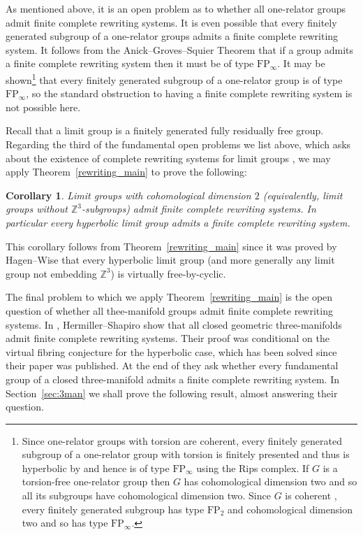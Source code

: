 \documentclass[12pt, a4paper]{amsart}
\newtheorem{corollary}[theorem]{Corollary}
\theoremstyle{definition}
\newcommand{\Z}{\mathbb{Z}}
\begin{document}
As mentioned above, it is an open problem as to whether all one-relator groups admit finite complete rewriting systems. It is even possible that every finitely generated subgroup of a one-relator groups admits a finite complete rewriting system. It follows from the Anick--Groves--Squier Theorem \cite{AGS} that if a group admits a finite complete rewriting system then it must be of type $\mathrm{FP}_\infty$. It may be shown\footnote{Since one-relator groups with torsion are coherent, every finitely generated subgroup of a one-relator group with torsion is finitely presented and thus is hyperbolic by \cite{Gersten} and hence is of type $\mathrm{FP}_\infty$ using the Rips complex. If $G$ is a torsion-free one-relator group then $G$ has cohomological dimension two and so all its subgroups have cohomological dimension two. Since $G$ is coherent \cite{JZL2025}, every finitely generated subgroup has type $\mathrm{FP}_2$ and cohomological dimension two and so has type $\mathrm{FP}_{\infty}$.} that every finitely generated subgroup of a one-relator group is of type $\mathrm{FP}_\infty$, so the standard obstruction to having a finite complete rewriting system is not possible here.  

Recall that a limit group is a finitely generated fully residually free group. Regarding the third of the fundamental open problems we list above, which asks about the existence of complete rewriting systems for limit groups \cite[Problem 2.7]{Diekert2010}, we may apply Theorem~\ref{rewriting_main} to prove the following:  

\begin{corollary}\label{theorem:LimitGroups}
Limit groups with cohomological dimension $2$   (equivalently, limit groups without $\Z^3$-subgroups) admit finite complete rewriting systems. In particular every  hyperbolic limit group admits a finite complete rewriting system.
\end{corollary}

This corollary follows from Theorem~\ref{rewriting_main} since it was proved by Hagen--Wise \cite[Corollary B]{HW2010} that every hyperbolic limit group (and more generally any limit group not embedding $\mathbb{Z}^3$) is virtually free-by-cyclic. 

The final problem to which we apply Theorem~\ref{rewriting_main} is the open question of whether all thee-manifold groups admit finite complete rewriting systems. In \cite{Hermiller1999}, Hermiller--Shapiro show that all closed geometric three-manifolds admit finite complete rewriting systems. Their proof was conditional on the virtual fibring conjecture for the hyperbolic case, which has been solved since their paper was published. At the end of \cite{Hermiller1999} they ask whether every fundamental group of a closed three-manifold admits a finite complete rewriting system. In Section~\ref{sec:3man} we shall prove the following result, almost answering their question.  
\end{document}
